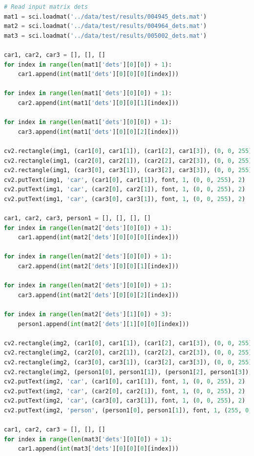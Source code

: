 \documentclass{csc_assignment4}
\begin{document}
\begin{description}
\begin{enumerate}[label=(\alph*)]
\begin{lstlisting}[language=Python]
# Read input matrix dets
mat1 = sci.loadmat('../data/test/results/004945_dets.mat')
mat2 = sci.loadmat('../data/test/results/004964_dets.mat')
mat3 = sci.loadmat('../data/test/results/005002_dets.mat')

car1, car2, car3 = [], [], []
for index in range(len(mat1['dets'][0][0]) + 1):
    car1.append(int(mat1['dets'][0][0][0][index]))

for index in range(len(mat1['dets'][0][0]) + 1):
    car2.append(int(mat1['dets'][0][0][1][index]))

for index in range(len(mat1['dets'][0][0]) + 1):
    car3.append(int(mat1['dets'][0][0][2][index]))

cv2.rectangle(img1, (car1[0], car1[1]), (car1[2], car1[3]), (0, 0, 255), 2)
cv2.rectangle(img1, (car2[0], car2[1]), (car2[2], car2[3]), (0, 0, 255), 2)
cv2.rectangle(img1, (car3[0], car3[1]), (car3[2], car3[3]), (0, 0, 255), 2)
cv2.putText(img1, 'car', (car1[0], car1[1]), font, 1, (0, 0, 255), 2)
cv2.putText(img1, 'car', (car2[0], car2[1]), font, 1, (0, 0, 255), 2)
cv2.putText(img1, 'car', (car3[0], car3[1]), font, 1, (0, 0, 255), 2)

car1, car2, car3, person1 = [], [], [], []
for index in range(len(mat2['dets'][0][0]) + 1):
    car1.append(int(mat2['dets'][0][0][0][index]))

for index in range(len(mat2['dets'][0][0]) + 1):
    car2.append(int(mat2['dets'][0][0][1][index]))

for index in range(len(mat2['dets'][0][0]) + 1):
    car3.append(int(mat2['dets'][0][0][2][index]))

for index in range(len(mat2['dets'][1][0]) + 3):
    person1.append(int(mat2['dets'][1][0][0][index]))

cv2.rectangle(img2, (car1[0], car1[1]), (car1[2], car1[3]), (0, 0, 255), 2)
cv2.rectangle(img2, (car2[0], car2[1]), (car2[2], car2[3]), (0, 0, 255), 2)
cv2.rectangle(img2, (car3[0], car3[1]), (car3[2], car3[3]), (0, 0, 255), 2)
cv2.rectangle(img2, (person1[0], person1[1]), (person1[2], person1[3]), (255, 0, 0), 2)
cv2.putText(img2, 'car', (car1[0], car1[1]), font, 1, (0, 0, 255), 2)
cv2.putText(img2, 'car', (car2[0], car2[1]), font, 1, (0, 0, 255), 2)
cv2.putText(img2, 'car', (car3[0], car3[1]), font, 1, (0, 0, 255), 2)
cv2.putText(img2, 'person', (person1[0], person1[1]), font, 1, (255, 0, 0), 2)

car1, car2, car3 = [], [], []
for index in range(len(mat3['dets'][0][0]) + 1):
    car1.append(int(mat3['dets'][0][0][0][index]))


\end{lstlisting}
\end{enumerate}
\end{description}
\end{document}
